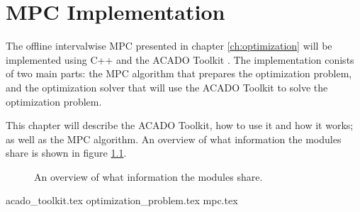 \chapter{MPC Implementation}

The offline intervalwise MPC presented in chapter \ref{ch:optimization} will be implemented using C++ and the ACADO Toolkit \cite{acadoHOUSKA}. The implementation conists of two main parts: the MPC algorithm that prepares the optimization problem, and the optimization solver that will use the ACADO Toolkit to solve the optimization problem.

This chapter will describe the ACADO Toolkit, how to use it and how it works; as well as the MPC algorithm. An overview of what information the modules share is shown in figure \ref{fig:sys_overview}.

\begin{figure}[h]
	\centering
	\caption{An overview of what information the modules share.}
	\label{fig:sys_overview}
\end{figure}
	
{acado_toolkit.tex}
{optimization_problem.tex}
{mpc.tex}